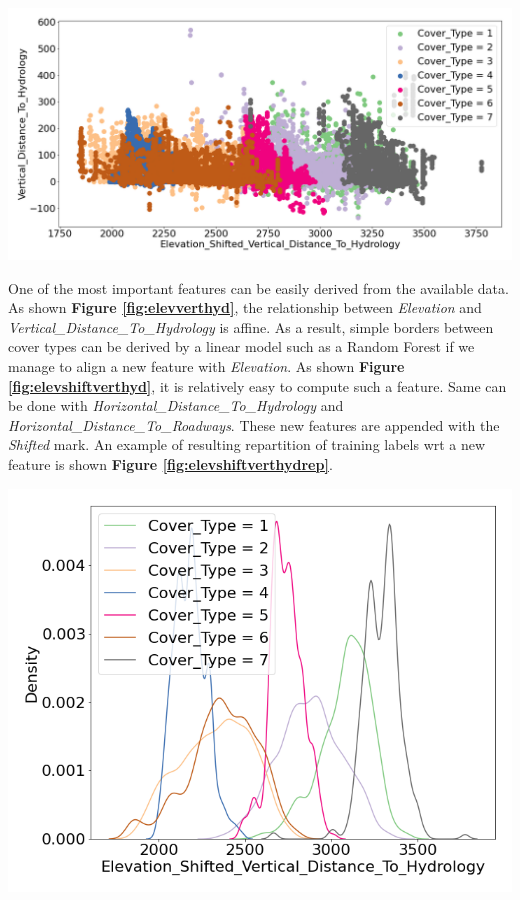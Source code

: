 \documentclass{article}
\newenvironment{Figure}
  {\par\medskip\noindent\minipage{\linewidth}}
  {\endminipage\par\medskip}
\begin{document}
\begin{multicols}{2}
\begin{Figure}
  \centering
  \captionsetup{type=figure}
  \includegraphics[width=0.85\linewidth]{figures/elevshiftverthyd.png}
  \label{fig:elevshiftverthyd}
\end{Figure}

One of the most important features can be easily derived
from the available data. As shown \textbf{Figure \ref{fig:elevverthyd}}, the relationship
between \textit{Elevation} and \textit{Vertical\_Distance\_To\_Hydrology} is
affine. As a result, simple borders between cover types can be derived by
a linear model such as a Random Forest if we manage to align a new feature
with \textit{Elevation}. As shown \textbf{Figure \ref{fig:elevshiftverthyd}}, it
is relatively easy to compute such a feature. Same can be done with
\textit{Horizontal\_Distance\_To\_Hydrology} and
\textit{Horizontal\_Distance\_To\_Roadways}. These new features are appended
with the \textit{Shifted} mark. An example of resulting repartition of
training labels wrt a new feature is shown \textbf{Figure \ref{fig:elevshiftverthydrep}}.

\begin{Figure}
  \centering
  \captionsetup{type=figure}
  \includegraphics[width=0.75\linewidth]{figures/elevshiftverthydrep.png}
  \label{fig:elevshiftverthydrep}
\end{Figure}


\end{multicols}
\end{document}
